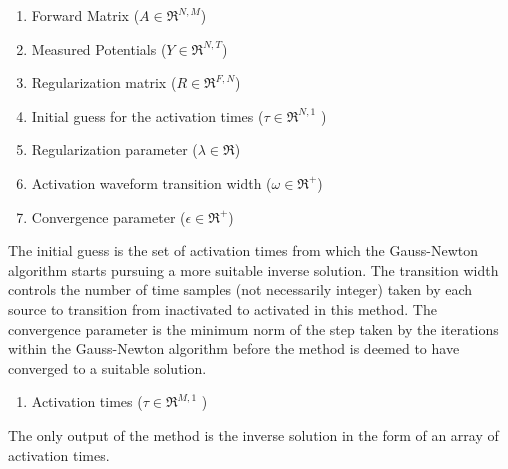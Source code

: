     \begin{enumerate}
        \item Forward Matrix ($A\in\Re^{N,M}$)
        \item Measured Potentials ($Y\in\Re^{N,T}$)
        \item Regularization matrix ($R\in\Re^{F,N}$)
        \item Initial guess for the activation times ($\tau\in\Re^{N,1}$ )
        \item Regularization parameter ($\lambda\in\Re$)
        \item Activation waveform transition width ($\omega\in\Re^{+}$)
        \item Convergence parameter ($\epsilon\in\Re^{+}$)
    \end{enumerate}
    The initial guess is the set of activation times from which the Gauss-Newton algorithm starts pursuing a more suitable inverse solution. 
    The transition width controls the number of time samples (not necessarily integer) taken by each source to transition from inactivated to activated in this method. 
    The convergence parameter is the minimum norm of the step taken by the iterations within the Gauss-Newton algorithm before the method is deemed to have converged to a suitable solution. 
    
    \begin{enumerate}
        \item Activation times ($\tau\in\Re^{M,1}$ )
    \end{enumerate}
    The only output of the method is the inverse solution in the form of an array of activation times.
    
